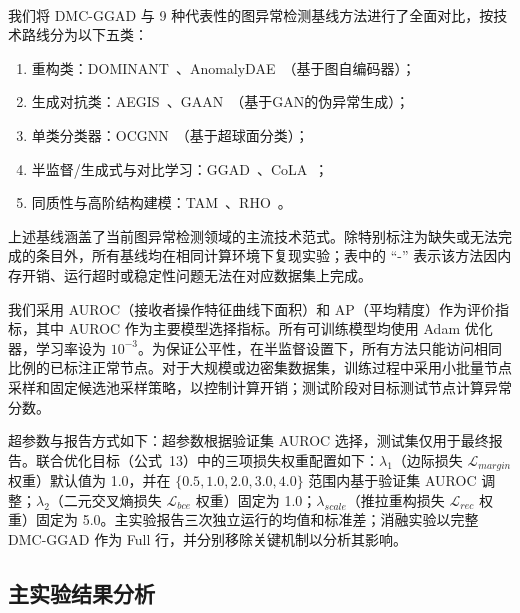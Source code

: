 ﻿﻿﻿﻿    \documentclass[conference, onecolumn]{IEEEtran}
\begin{document}
    我们将 DMC-GGAD 与 9 种代表性的图异常检测基线方法进行了全面对比，按技术路线分为以下五类：
    \begin{enumerate}
        \item 重构类：DOMINANT~\cite{ref_dominant}、AnomalyDAE~\cite{ref_anomalydae}（基于图自编码器）；
        \item 生成对抗类：AEGIS~\cite{ref_aegis}、GAAN~\cite{ref_gaan}（基于GAN的伪异常生成）；
        \item 单类分类器：OCGNN~\cite{ref_ocgnn}（基于超球面分类）；
        \item 半监督/生成式与对比学习：GGAD~\cite{ref7}、CoLA~\cite{ref_cola2022}；
        \item 同质性与高阶结构建模：TAM~\cite{ref4}、RHO~\cite{ref_rho2023}。
    \end{enumerate}
    上述基线涵盖了当前图异常检测领域的主流技术范式。除特别标注为缺失或无法完成的条目外，所有基线均在相同计算环境下复现实验；表中的 ``-'' 表示该方法因内存开销、运行超时或稳定性问题无法在对应数据集上完成。

    我们采用 AUROC（接收者操作特征曲线下面积）和 AP（平均精度）作为评价指标，其中 AUROC 作为主要模型选择指标。所有可训练模型均使用 Adam 优化器，学习率设为 $10^{-3}$。为保证公平性，在半监督设置下，所有方法只能访问相同比例的已标注正常节点。对于大规模或边密集数据集，训练过程中采用小批量节点采样和固定候选池采样策略，以控制计算开销；测试阶段对目标测试节点计算异常分数。

    超参数与报告方式如下：超参数根据验证集 AUROC 选择，测试集仅用于最终报告。联合优化目标（公式~13）中的三项损失权重配置如下：$\lambda_1$（边际损失 $\mathcal{L}_{margin}$ 权重）默认值为 1.0，并在 $\{0.5, 1.0, 2.0, 3.0, 4.0\}$ 范围内基于验证集 AUROC 调整；$\lambda_2$（二元交叉熵损失 $\mathcal{L}_{bce}$ 权重）固定为 1.0；$\lambda_{scale}$（推拉重构损失 $\mathcal{L}_{rec}$ 权重）固定为 5.0。主实验报告三次独立运行的均值和标准差；消融实验以完整 DMC-GGAD 作为 Full 行，并分别移除关键机制以分析其影响。

    \subsection{主实验结果分析}
\end{document}
